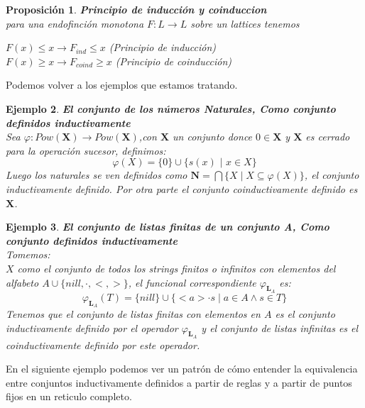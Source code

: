 \documentclass[executivepaper]{article}
\newtheorem{propo}{Proposición}[section]
\newtheorem{ejemplo}[propo]{Ejemplo}
\begin{document}
\begin{propo}\textbf{Principio de inducción y coinduccion}\\
    para una endofinción monotona $F:L\rightarrow L$ sobre un lattices tenemos
    \begin{center}
        $F(x)\leq x \rightarrow F_{ind}\leq x$ (Principio de inducción)\\
        $F(x)\geq x \rightarrow F_{coind}\geq x$ (Principio de coinducción)
    \end{center}
\end{propo}

Podemos volver a los ejemplos que estamos tratando. 

\begin{ejemplo} \textbf{El conjunto de los números Naturales, Como conjunto definidos inductivamente}\\
Sea $\varphi:Pow(\mathbf{X})\longrightarrow Pow(\mathbf{X})$,con $\mathbf{X}$ un conjunto donce $0\in \mathbf{X}$ y $\mathbf{X}$ es cerrado para la operación sucesor, definimos:
$$\varphi(X)=\{0\} \cup \{s(x)\,\,|\,\,x\in X\}$$
Luego los naturales se ven definidos como $\mathbf{N}=\bigcap \{X \mid X\subseteq\varphi(X)\}$, el conjunto inductivamente definido. Por otra parte el conjunto coinductivamente definido es $\mathbf{X}$.
\end{ejemplo}
    
\begin{ejemplo}\textbf{El conjunto de listas finitas de un conjunto A, Como conjunto definidos inductivamente}\\
Tomemos:\\ 
    $X$ como el conjunto de todos los strings finitos o infinitos con elementos del alfabeto $A\cup\{nill, \cdot, <, >\}$, el funcional correspondiente $\varphi_{\mathbf{L}_A}$ es:
    $$\varphi_{\mathbf{L}_A}(T) = \{nill\} \cup \{<a>\cdot s \mid a\in A \land s \in T \}$$
Tenemos que el conjunto de listas finitas con elementos en $A$ es el conjunto inductivamente definido por el operador $\varphi_{\mathbf{L}_A}$ y el conjunto de listas infinitas es el coinductivamente definido por este operador.
\end{ejemplo}

En el siguiente ejemplo podemos ver un patrón de cómo entender la equivalencia entre conjuntos inductivamente definidos a partir de reglas y a partir de puntos fijos en un reticulo completo.
\end{document}
